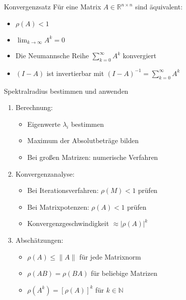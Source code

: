 \begin{theorem}{Konvergenzsatz}
Für eine Matrix $A \in \mathbb{R}^{n\times n}$ sind äquivalent:
\begin{itemize}
    \item $\rho(A) < 1$
    \item $\lim_{k\to\infty} A^k = 0$
    \item Die Neumannsche Reihe $\sum_{k=0}^\infty A^k$ konvergiert
    \item $(I-A)$ ist invertierbar mit $(I-A)^{-1} = \sum_{k=0}^\infty A^k$
\end{itemize}
\end{theorem}

\begin{KR}{Spektralradius bestimmen und anwenden}
\begin{enumerate}
    \item Berechnung:
    \begin{itemize}
        \item Eigenwerte $\lambda_i$ bestimmen
        \item Maximum der Absolutbeträge bilden
        \item Bei großen Matrizen: numerische Verfahren
    \end{itemize}
    
    \item Konvergenzanalyse:
    \begin{itemize}
        \item Bei Iterationsverfahren: $\rho(M) < 1$ prüfen
        \item Bei Matrixpotenzen: $\rho(A) < 1$ prüfen
        \item Konvergenzgeschwindigkeit $\approx |\rho(A)|^k$
    \end{itemize}
    
    \item Abschätzungen:
    \begin{itemize}
        \item $\rho(A) \leq \|A\|$ für jede Matrixnorm
        \item $\rho(AB) = \rho(BA)$ für beliebige Matrizen
        \item $\rho(A^k) = [\rho(A)]^k$ für $k \in \mathbb{N}$
    \end{itemize}
\end{enumerate}
\end{KR}

